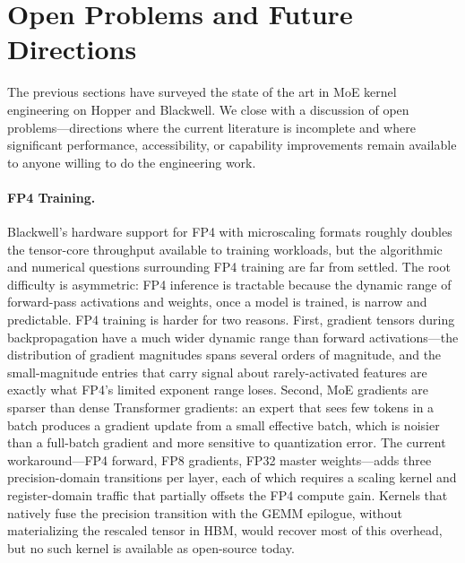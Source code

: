 \documentclass[10pt]{article}
\begin{document}
\section{Open Problems and Future Directions}
\label{sec:future}

The previous sections have surveyed the state of the art in MoE kernel engineering on Hopper and Blackwell. We close with a discussion of open problems---directions where the current literature is incomplete and where significant performance, accessibility, or capability improvements remain available to anyone willing to do the engineering work.

\paragraph{FP4 Training.}
Blackwell's hardware support for FP4 with microscaling formats roughly doubles the tensor-core throughput available to training workloads, but the algorithmic and numerical questions surrounding FP4 training are far from settled. The root difficulty is asymmetric: FP4 inference is tractable because the dynamic range of forward-pass activations and weights, once a model is trained, is narrow and predictable. FP4 training is harder for two reasons. First, gradient tensors during backpropagation have a much wider dynamic range than forward activations---the distribution of gradient magnitudes spans several orders of magnitude, and the small-magnitude entries that carry signal about rarely-activated features are exactly what FP4's limited exponent range loses. Second, MoE gradients are sparser than dense Transformer gradients: an expert that sees few tokens in a batch produces a gradient update from a small effective batch, which is noisier than a full-batch gradient and more sensitive to quantization error. The current workaround---FP4 forward, FP8 gradients, FP32 master weights---adds three precision-domain transitions per layer, each of which requires a scaling kernel and register-domain traffic that partially offsets the FP4 compute gain. Kernels that natively fuse the precision transition with the GEMM epilogue, without materializing the rescaled tensor in HBM, would recover most of this overhead, but no such kernel is available as open-source today.
\end{document}
